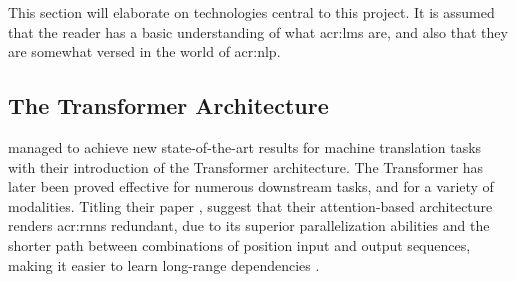 This section will elaborate on technologies central to this project. It is assumed that the reader has a basic understanding of what \glspl{acr:lm} are, and also that they are somewhat versed in the world of \acrfull{acr:nlp}.

\subsection{The Transformer Architecture}

\cite{vaswaniAttentionAllYou2017a} managed to achieve new state-of-the-art results for machine translation tasks with their introduction of the Transformer architecture. The Transformer has later been proved effective for numerous downstream tasks, and for a variety of modalities. Titling their paper , \citeauthor{vaswaniAttentionAllYou2017a} suggest that their attention-based architecture renders \glspl{acr:rnn} redundant, due to its superior parallelization abilities and the shorter path between combinations of position input and output sequences, making it easier to learn long-range dependencies \citep[6]{vaswaniAttentionAllYou2017a}.

